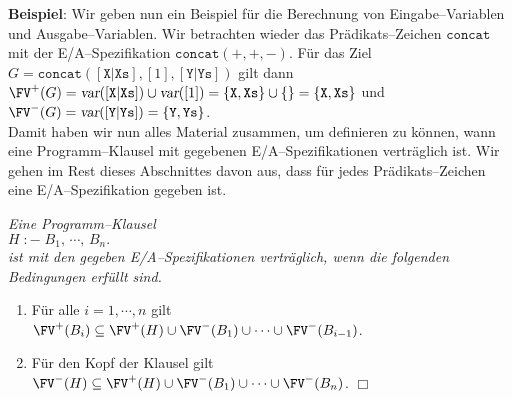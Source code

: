 \noindent
\textbf{Beispiel}:  Wir geben nun ein Beispiel f\"{u}r die Berechnung von Eingabe--Variablen und Ausgabe--Variablen.
Wir betrachten wieder das Pr\"{a}dikats--Zeichen $\mathtt{concat}$ mit der E/A--Spezifikation 
$\mathtt{concat}(+,+,-)$.  F\"{u}r das Ziel $G = \mathtt{concat}( [ \mathtt{X} | \mathtt{Xs} ], [1], [ \mathtt{Y} | \mathtt{Ys} ] )$ gilt dann \\[0.1cm]
\hspace*{1.3cm} $\FV^+(G) = \textsl{var}([ \mathtt{X} | \mathtt{Xs} ]) \cup \textsl{var}([1]) = \{ \mathtt{X}, \mathtt{Xs} \} \cup \{\} = \{ \mathtt{X}, \mathtt{Xs} \}$ \quad und \\[0.1cm]
\hspace*{1.3cm} $\FV^-(G) = \textsl{var}([ \mathtt{Y} | \mathtt{Ys} ]) = \{ \mathtt{Y}, \mathtt{Ys} \}$. \\[0.1cm]
Damit haben wir nun alles Material zusammen, um definieren zu k\"{o}nnen, wann eine Programm--Klausel
mit gegebenen E/A--Spezifikationen vertr\"{a}glich ist.  Wir gehen im Rest dieses Abschnittes davon aus, dass
f\"{u}r jedes Pr\"{a}dikats--Zeichen eine E/A--Spezifikation gegeben ist.

\begin{Definition}
{\em
    Eine Programm--Klausel \\[0.1cm]
    \hspace*{1.3cm} $H \;\mathtt{:-}\; B_1\mathtt{,}\, \cdots\mathtt{,}\, B_n\mathtt{.}$ \\[0.1cm]
    ist mit den gegeben E/A--Spezifikationen \emph{vertr\"{a}glich}, wenn die folgenden Bedingungen erf\"{u}llt sind.
    \begin{enumerate}
    \item F\"{u}r alle $i=1,\cdots,n$ gilt \\[0.1cm]
          \hspace*{1.3cm} $\FV^+(B_i) \subseteq \FV^+(H) \cup \FV^-(B_1) \cup \cdots \cup \FV^-(B_{i-1})$.
    \item F\"{u}r den Kopf der Klausel gilt \\[0.1cm]
          \hspace*{1.3cm}  $\FV^-(H) \subseteq \FV^+(H) \cup \FV^-(B_1) \cup \cdots \cup \FV^-(B_{n})$. \hspace*{\fill} $\Box$
    \end{enumerate}
}
\end{Definition}

